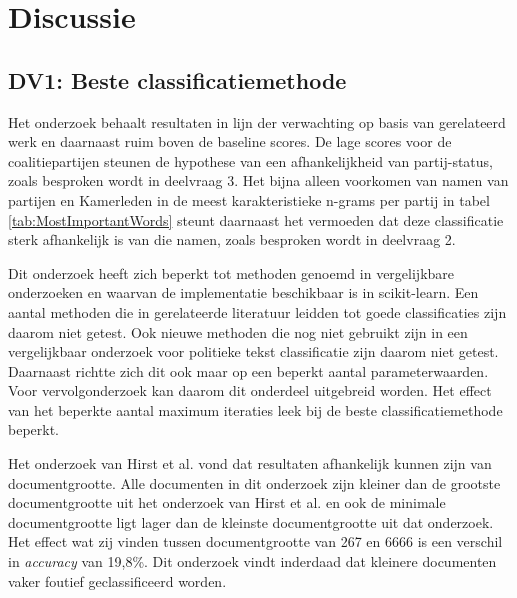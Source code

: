 \section{Discussie}
\subsection{DV1: Beste classificatiemethode}
Het onderzoek behaalt resultaten in lijn der verwachting op basis van gerelateerd werk en daarnaast ruim boven de baseline scores. De lage scores voor de coalitiepartijen steunen de hypothese van een afhankelijkheid van partij-status, zoals besproken wordt in deelvraag 3. Het bijna alleen voorkomen van namen van partijen en Kamerleden in de meest karakteristieke n-grams per partij in tabel \ref{tab:MostImportantWords} steunt daarnaast het vermoeden dat deze classificatie sterk afhankelijk is van die namen, zoals besproken wordt in deelvraag 2.\par
Dit onderzoek heeft zich beperkt tot methoden genoemd in vergelijkbare onderzoeken en waarvan de implementatie beschikbaar is in scikit-learn. Een aantal methoden die in gerelateerde literatuur leidden tot goede classificaties zijn daarom niet getest. Ook nieuwe methoden die nog niet gebruikt zijn in een vergelijkbaar onderzoek voor politieke tekst classificatie zijn daarom niet getest. Daarnaast richtte zich dit ook maar op een beperkt aantal parameterwaarden. Voor vervolgonderzoek kan daarom dit onderdeel uitgebreid worden. Het effect van het beperkte aantal maximum iteraties leek bij de beste classificatiemethode beperkt.\par
Het onderzoek van Hirst et al. vond dat resultaten afhankelijk kunnen zijn van documentgrootte. Alle documenten in dit onderzoek zijn kleiner dan de grootste documentgrootte uit het onderzoek van Hirst et al. en ook de minimale documentgrootte ligt lager dan de kleinste documentgrootte uit dat onderzoek.
Het effect wat zij vinden tussen documentgrootte van 267 en 6666 is een verschil in \textit{accuracy} van 19,8\%. Dit onderzoek vindt inderdaad dat kleinere documenten vaker foutief geclassificeerd worden.
